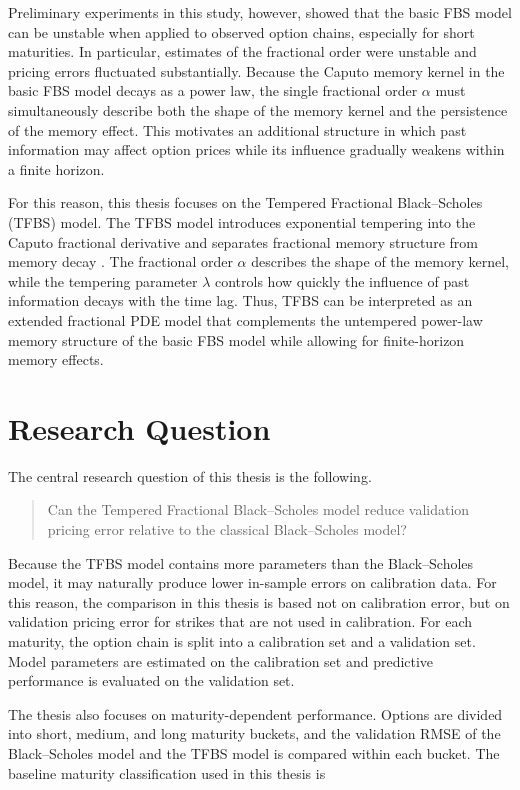 \documentclass[11pt,a4paper]{report}
\begin{document}
Preliminary experiments in this study, however, showed that the basic FBS model can be unstable when applied to observed option chains, especially for short maturities. In particular, estimates of the fractional order were unstable and pricing errors fluctuated substantially. Because the Caputo memory kernel in the basic FBS model decays as a power law, the single fractional order $\alpha$ must simultaneously describe both the shape of the memory kernel and the persistence of the memory effect. This motivates an additional structure in which past information may affect option prices while its influence gradually weakens within a finite horizon.

For this reason, this thesis focuses on the Tempered Fractional Black--Scholes (TFBS) model. The TFBS model introduces exponential tempering into the Caputo fractional derivative and separates fractional memory structure from memory decay \cite{SabzikarMeerschaertChen2015}. The fractional order $\alpha$ describes the shape of the memory kernel, while the tempering parameter $\lambda$ controls how quickly the influence of past information decays with the time lag. Thus, TFBS can be interpreted as an extended fractional PDE model that complements the untempered power-law memory structure of the basic FBS model while allowing for finite-horizon memory effects.

\section{Research Question}

The central research question of this thesis is the following.

\begin{quote}
Can the Tempered Fractional Black--Scholes model reduce validation pricing error relative to the classical Black--Scholes model?
\end{quote}

Because the TFBS model contains more parameters than the Black--Scholes model, it may naturally produce lower in-sample errors on calibration data. For this reason, the comparison in this thesis is based not on calibration error, but on validation pricing error for strikes that are not used in calibration. For each maturity, the option chain is split into a calibration set and a validation set. Model parameters are estimated on the calibration set and predictive performance is evaluated on the validation set.

The thesis also focuses on maturity-dependent performance. Options are divided into short, medium, and long maturity buckets, and the validation RMSE of the Black--Scholes model and the TFBS model is compared within each bucket. The baseline maturity classification used in this thesis is
\end{document}
